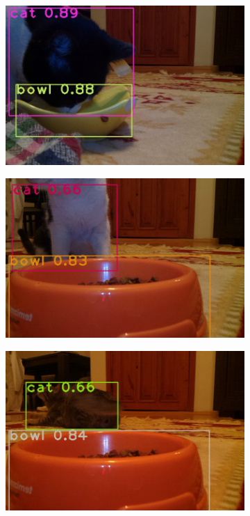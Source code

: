 \begin{figure}[ht!]
     \centering
     \begin{subfigure}[b]{0.49\textwidth}
     \includegraphics[width=\linewidth]{img/catbowl.jpg}
     \caption{}
     \label{fig:catbowl1}
     \end{subfigure}
     \begin{subfigure}[b]{0.49\textwidth}
     \includegraphics[width=\linewidth]{img/catbowl2.jpg}
     \caption {}
     \label{fig:catbowl2}
     \end{subfigure}        
     \begin{subfigure}[c]{0.49\textwidth}
     \includegraphics[width=\linewidth]{img/catbowl3.jpg}

\end{subfigure}
\end{figure}
